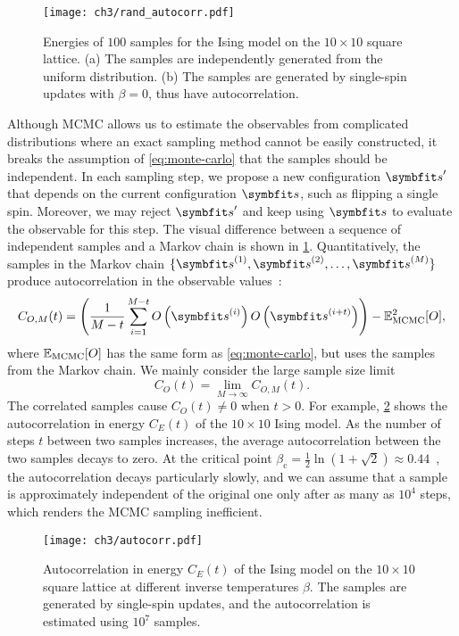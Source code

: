 \begin{figure}[htb]
\centering
\texttt{[image: ch3/rand\_autocorr.pdf]}
\caption[Energy of Ising model from independent and autocorrelated samples]{
Energies of $100$ samples for the Ising model on the $10 \times 10$ square lattice.
(a) The samples are independently generated from the uniform distribution.
(b) The samples are generated by single-spin updates with $\beta = 0$, thus have autocorrelation.
}
\label{fig:rand-autocorr}
\end{figure}

Although MCMC allows us to estimate the observables from complicated distributions where an exact sampling method cannot be easily constructed, it breaks the assumption of \cref{eq:monte-carlo} that the samples should be independent. In each sampling step, we propose a new configuration $\vs'$ that depends on the current configuration $\vs$, such as flipping a single spin. Moreover, we may reject $\vs'$ and keep using $\vs$ to evaluate the observable for this step. The visual difference between a sequence of independent samples and a Markov chain is shown in \cref{fig:rand-autocorr}. Quantitatively, the samples in the Markov chain $\{\vs^{(1)}, \vs^{(2)}, \ldots, \vs^{(M)}\}$ produce autocorrelation in the observable values~\cite{muller1973dynamic}:
\begin{equation}
C_{O, M}(t) = \left( \frac{1}{M - t} \sum_{i = 1}^{M - t} O\left( \vs^{(i)} \right) O\left( \vs^{(i + t)} \right) \right) - \bbE_\text{MCMC}^2[O],
\end{equation}
where $\mathbb{E}_\text{MCMC}[O]$ has the same form as \cref{eq:monte-carlo}, but uses the samples from the Markov chain. We mainly consider the large sample size limit
\begin{equation}
C_O(t) = \lim_{M \to \infty} C_{O, M}(t).
\end{equation}
The correlated samples cause $C_O(t) \neq 0$ when $t > 0$. For example, \cref{fig:autocorr} shows the autocorrelation in energy $C_E(t)$ of the $10 \times 10$ Ising model. As the number of steps $t$ between two samples increases, the average autocorrelation between the two samples decays to zero. At the critical point $\beta_\text{c} = \frac{1}{2} \ln(1 + \sqrt{2}) \approx 0.44$~\cite{onsager1944crystal}, the autocorrelation decays particularly slowly, and we can assume that a sample is approximately independent of the original one only after as many as $10^4$ steps, which renders the MCMC sampling inefficient.

\begin{figure}[htb]
\centering
\texttt{[image: ch3/autocorr.pdf]}
\caption[Autocorrelation in energy for Ising model at different temperatures]{
Autocorrelation in energy $C_E(t)$ of the Ising model on the $10 \times 10$ square lattice at different inverse temperatures $\beta$. The samples are generated by single-spin updates, and the autocorrelation is estimated using $10^7$ samples.
}
\label{fig:autocorr}
\end{figure}

